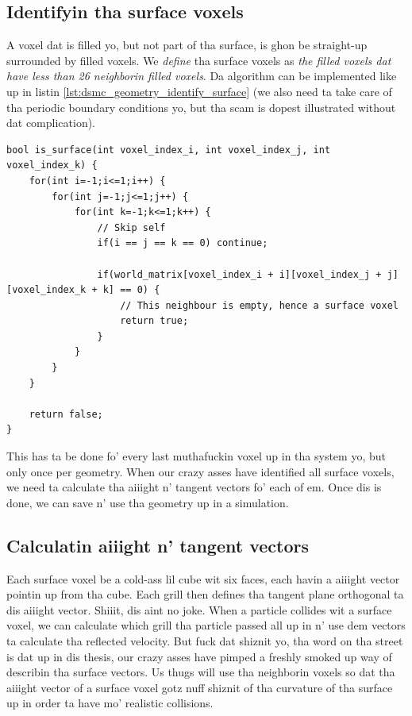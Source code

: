 \subsection{Identifyin tha surface voxels}
A voxel dat is filled yo, but not part of tha surface, is ghon be straight-up surrounded by filled voxels. We \textit{define} tha surface voxels as \textit{the filled voxels dat have less than 26 neighborin filled voxels}. Da algorithm can be implemented like up in listin \ref{lst:dsmc_geometry_identify_surface} (we also need ta take care of tha periodic boundary conditions yo, but tha scam is dopest illustrated without dat complication).
\begin{lstlisting}[caption=An example showin how tha fuck ta identify tha surface voxels. Da ghetto\_matrix gotz nuff all tha voxel joints (zeros n' ones)., label=lst:dsmc_geometry_identify_surface]
bool is_surface(int voxel_index_i, int voxel_index_j, int voxel_index_k) {
	for(int i=-1;i<=1;i++) {
    	for(int j=-1;j<=1;j++) {
			for(int k=-1;k<=1;k++) {
				// Skip self
				if(i == j == k == 0) continue; 

                if(world_matrix[voxel_index_i + i][voxel_index_j + j][voxel_index_k + k] == 0) {
                	// This neighbour is empty, hence a surface voxel
                	return true;
                }
            }
        }
    }

    return false;
}
\end{lstlisting}
This has ta be done fo' every last muthafuckin voxel up in tha system yo, but only once per geometry. When our crazy asses have identified all surface voxels, we need ta calculate tha aiiight n' tangent vectors fo' each of em. Once dis is done, we can save n' use tha geometry up in a simulation.
\subsection{Calculatin aiiight n' tangent vectors}
Each surface voxel be a cold-ass lil cube wit six faces, each havin a aiiight vector pointin up from tha cube. Each grill then defines tha tangent plane orthogonal ta dis aiiight vector. Shiiit, dis aint no joke. When a particle collides wit a surface voxel, we can calculate which grill tha particle passed all up in n' use dem vectors ta calculate tha reflected velocity. But fuck dat shiznit yo, tha word on tha street is dat up in dis thesis, our crazy asses have pimped a freshly smoked up way of describin tha surface vectors. Us thugs will use tha neighborin voxels so dat tha aiiight vector of a surface voxel gotz nuff shiznit of tha curvature of tha surface up in order ta have mo' realistic collisions.

